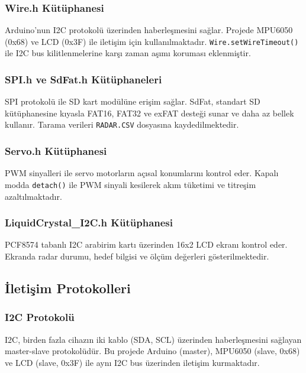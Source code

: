 \subsubsection{Wire.h Kütüphanesi}

Arduino'nun I2C protokolü üzerinden haberleşmesini sağlar. Projede MPU6050 (0x68) ve LCD (0x3F) ile iletişim için kullanılmaktadır. \texttt{Wire.setWireTimeout()} ile I2C bus kilitlenmelerine karşı zaman aşımı koruması eklenmiştir.

\subsubsection{SPI.h ve SdFat.h Kütüphaneleri}

SPI protokolü ile SD kart modülüne erişim sağlar. SdFat, standart SD kütüphanesine kıyasla FAT16, FAT32 ve exFAT desteği sunar ve daha az bellek kullanır. Tarama verileri \texttt{RADAR.CSV} dosyasına kaydedilmektedir.

\subsubsection{Servo.h Kütüphanesi}

PWM sinyalleri ile servo motorların açısal konumlarını kontrol eder. Kapalı modda \texttt{detach()} ile PWM sinyali kesilerek akım tüketimi ve titreşim azaltılmaktadır.

\subsubsection{LiquidCrystal\_I2C.h Kütüphanesi}

PCF8574 tabanlı I2C arabirim kartı üzerinden 16x2 LCD ekranı kontrol eder. Ekranda radar durumu, hedef bilgisi ve ölçüm değerleri gösterilmektedir.

\subsection{İletişim Protokolleri}

\subsubsection{I2C Protokolü}

I2C, birden fazla cihazın iki kablo (SDA, SCL) üzerinden haberleşmesini sağlayan master-slave protokolüdür. Bu projede Arduino (master), MPU6050 (slave, 0x68) ve LCD (slave, 0x3F) ile aynı I2C bus üzerinden iletişim kurmaktadır.

